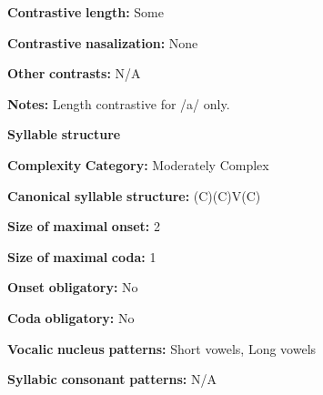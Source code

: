 \documentclass[output=paper]{langsci/langscibook}
\begin{document}
\begin{styleBody}
\textbf{Contrastive} \textbf{length:} Some
\end{styleBody}

\begin{styleBody}
\textbf{Contrastive} \textbf{nasalization:} None
\end{styleBody}

\begin{styleBody}
\textbf{Other} \textbf{contrasts:} N/A
\end{styleBody}

\begin{styleBody}
\textbf{Notes:} Length contrastive for /a/ only.
\end{styleBody}

\begin{styleBody}
\textbf{Syllable} \textbf{structure}
\end{styleBody}

\begin{styleBody}
\textbf{Complexity} \textbf{Category:} Moderately Complex
\end{styleBody}

\begin{styleBody}
\textbf{Canonical} \textbf{syllable} \textbf{structure:} (C)(C)V(C) \citep[123-7]{Clark2008}
\end{styleBody}

\begin{styleBody}
\textbf{Size} \textbf{of} \textbf{maximal} \textbf{onset:} 2
\end{styleBody}

\begin{styleBody}
\textbf{Size} \textbf{of} \textbf{maximal} \textbf{coda:} 1
\end{styleBody}

\begin{styleBody}
\textbf{Onset} \textbf{obligatory:} No
\end{styleBody}

\begin{styleBody}
\textbf{Coda} \textbf{obligatory:} No
\end{styleBody}

\begin{styleBody}
\textbf{Vocalic} \textbf{nucleus} \textbf{patterns:} Short vowels, Long vowels
\end{styleBody}

\begin{styleBody}
\textbf{Syllabic} \textbf{consonant} \textbf{patterns:} N/A
\end{styleBody}
\end{document}
